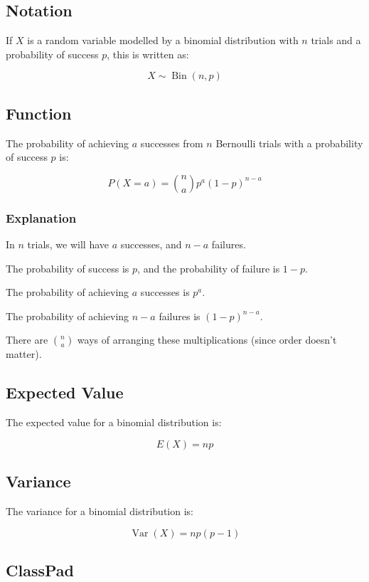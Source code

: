 \documentclass[a4paper,11pt]{article}
\DeclareMathOperator\Bin{Bin}
\DeclareMathOperator\Var{Var}
\begin{document}
\subsection{Notation}

If $X$ is a random variable modelled by a binomial distribution with $n$
trials and a probability of success $p$, this is written as:

$$
X \sim \Bin(n, p)
$$


\subsection{Function}

The probability of achieving $a$ successes from $n$ Bernoulli trials with a
probability of success $p$ is:

$$
P(X = a) = \binom{n}{a} p^a (1 - p)^{n - a}
$$


\subsubsection{Explanation}

In $n$ trials, we will have $a$ successes, and $n - a$ failures.

The probability of success is $p$, and the probability of failure is $1 - p$.

The probability of achieving $a$ successes is $p^a$.

The probability of achieving $n - a$ failures is $(1 - p)^{n - a}$.

There are $\binom{n}{a}$ ways of arranging these multiplications (since order
doesn't matter).


\subsection{Expected Value}

The expected value for a binomial distribution is:

$$
E(X) = np
$$


\subsection{Variance}

The variance for a binomial distribution is:

$$
\Var(X) = np(p - 1)
$$


\subsection{ClassPad}
\end{document}
